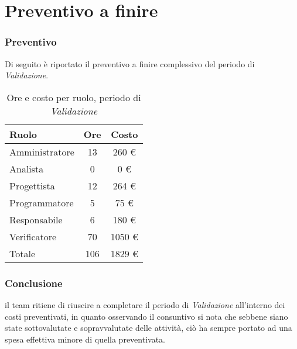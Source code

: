 \section{Preventivo a finire}
\subsubsection{Preventivo}
Di seguito \`e riportato il preventivo a finire complessivo del periodo di \textit{Validazione}.

\begin{table}[H]
	\centering
	\begin{tabular}{ l c c }
		\textbf{Ruolo} & \textbf{Ore} & \textbf{Costo} \\
		\hline
		Amministratore & 13 & 260 \euro{} \\
		Analista & 0 & 0 \euro{} \\
		Progettista & 12 & 264 \euro{} \\
		Programmatore & 5 & 75 \euro{} \\
		Responsabile & 6 & 180 \euro{} \\
		Verificatore & 70 & 1050 \euro{} \\
		\hline
		Totale & 106 & 1829 \euro{} \\
		\hline
	\end{tabular}
	\caption{Ore e costo per ruolo, periodo di \textit{Validazione}}
\end{table}


\subsubsection{Conclusione}
il team ritiene di riuscire a completare il periodo di \textit{Validazione} all'interno dei costi preventivati, in quanto osservando il consuntivo si nota che sebbene siano state sottovalutate e sopravvalutate delle attivit\`a, ci\`o ha sempre portato ad una spesa effettiva minore di quella preventivata.

\newpage